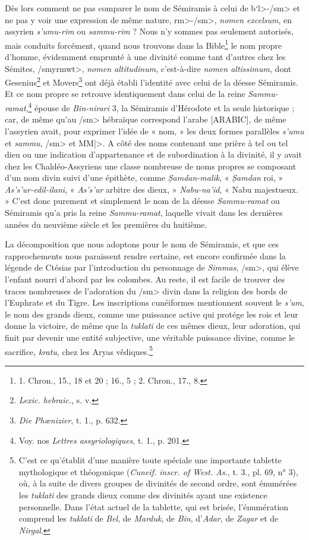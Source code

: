 \documentclass[a4paper, 11pt, oneside]{article}
\begin{document}
Dès lors comment ne pas comparer le nom de Sémiramis à celui de \<b`l>-\</sm> et ne pas y voir une expression de même nature, \<rm>-\</sm>, \emph{nomen excelsum}, en assyrien \emph{s'umu-rim} ou \emph{sammu-rim} ? Nous n'y sommes pas seulement autorisés, mais conduits forcément, quand nous trouvons dans la Bible\footnote{1. Chron., 15., 18 et 20 ; 16., 5 ; 2. Chron., 17., 8.} le nom propre d'homme, évidemment emprunté à une divinité comme tant d'autres chez les Sémites, \</smyrmwt>, \emph{nomen altitudinum}, c'est-à-dire \emph{nomen altissimum}, dont Gesenius\footnote{\emph{Lexic. hebraic.}, s. v.} et Movers\footnote{\emph{Die Phœnizier}, t. 1., p. 632.} ont déjà établi l'identité avec celui de la déesse Sémiramis. Et ce nom propre se retrouve identiquement dans celui de la reine \emph{Sammu-ramat},\footnote{Voy. nos \emph{Lettres assyriologiques}, t. 1., p. 201.} épouse de \emph{Bin-nirari} 3, la Sémiramis d'Hérodote et la seule historique ; car, de même qu'au \</sm> hébraïque correspond l'arabe [ARABIC], de même l'assyrien avait, pour exprimer l'idée de « nom, » les deux formes parallèles \emph{s'umu} et \emph{sammu}, \</sm> et \<MM|>. A côté des noms contenant une prière à tel ou tel dieu ou une indication d'appartenance et de subordination à la divinité, il y avait chez les Chaldéo-Assyriens une classe nombreuse de noms propres se composant d'un nom divin suivi d'une épithète, comme \emph{\d{S}amdan-malik}, « \emph{\d{S}amdan} roi, » \emph{As's'ur-edil-ilani}, « \emph{As's'ur} arbitre des dieux, » \emph{Nabu-na'id}, « Nabu majestueux. » C'est donc purement et simplement le nom de la déesse \emph{Sammu-ramat} ou Sémiramis qu'a pris la reine \emph{Sammu-ramat}, laquelle vivait dans les dernières années du neuvième siècle et les premières du huitième.

La décomposition que nous adoptons pour le nom de Sémiramis, et que ces rapprochements nous paraissent rendre certaine, est encore confirmée dans la légende de Ctésias par l'introduction du personnage de \emph{Simmas}, \</sm>, qui élève l'enfant nourri d'abord par les colombes. Au reste, il est facile de trouver des traces nombreuses de l'adoration du \</sm> divin dans la religion des bords de l'Euphrate et du Tigre. Les inscriptions cunéiformes mentionnent souvent le \emph{s'um}, le nom des grands dieux, comme une puissance active qui protége les rois et leur donne la victoire, de même que la \emph{tuklati} de ces mêmes dieux, leur adoration, qui finit par devenir une entité subjective, une véritable puissance divine, comme le sacrifice, \emph{kratu}, chez les Aryas vêdiques.\footnote{C'est ce qu'établit d'une manière toute spéciale une importante tablette mythologique et théogonique (\emph{Cuneif. inscr. of West. As.}, t. 3., pl. 69, n° 3), où, à la suite de divers groupes de divinités de second ordre, sont énumérées les \emph{tuklati} des grands dieux comme des divinités ayant une existence personnelle. Dans l'état actuel de la tablette, qui est brisée, l'énumération comprend les \emph{tuklati} de \emph{Bel}, de \emph{Marduk}, de \emph{Bin}, d'\emph{Adar}, de \emph{Zagar} et de \emph{Nirgal}.}
\end{document}
